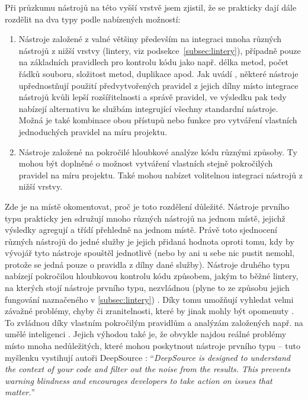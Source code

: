 Při průzkumu nástrojů na této vyšší vrstvě jsem zjistil, že se prakticky dají dále rozdělit na dva typy podle nabízených možností:
\begin{enumerate}
    \item Nástroje založené z valné většiny především na integraci mnoha různých nástrojů z nižší vrstvy (lintery, viz podsekce~\ref{subsec:lintery}), případně pouze na základních pravidlech pro kontrolu kódu jako např. délka metod, počet řádků souboru, složitost metod, duplikace apod. Jak uvádí \cite{globema-onpremise}, některé nástroje upřednostňují použití předvytvořených pravidel z jejich dílny místo integrace nástrojů kvůli lepší rozšířitelnosti a správě pravidel, ve výsledku pak tedy nabízejí alternativu ke službám integrující všechny standardní nástroje. Možná je také kombinace obou přístupů nebo funkce pro vytváření vlastních jednoduchých pravidel na míru projektu.
    \item Nástroje založené na pokročilé hloubkové analýze kódu různými způsoby. Ty mohou být doplněné o možnost vytváření vlastních stejně pokročilých pravidel na míru projektu. Také mohou nabízet volitelnou integraci nástrojů z nižší vrstvy.
\end{enumerate}

Zde je na místě okomentovat, proč je toto rozdělení důležité. Nástroje prvního typu prakticky jen sdružují mnoho různých nástrojů na jednom místě, jejichž výsledky agregují a třídí přehledně na jednom místě. Právě toto sjednocení různých nástrojů do jedné služby je jejich přidaná hodnota oproti tomu, kdy by vývojář tyto nástroje spouštěl jednotlivě (nebo by ani u sebe nic pustit nemohl, protože se jedná pouze o pravidla z dílny dané služby). Nástroje druhého typu nabízejí pokročilou hloubkovou kontrolu kódu způsobem, jakým to běžné lintery, na kterých stojí nástroje prvního typu, nezvládnou (plyne to ze způsobu jejich fungování naznačeného v \ref{subsec:lintery}) \cite{deepscan-lintercompare}. Díky tomu umožňují vyhledat velmi závažné problémy, chyby či zranitelnosti, které by jinak mohly být opomenuty \cite{deepscan-lintercompare, deepsource2}. To zvládnou díky vlastním pokročilým pravidlům a analýzám založených např. na umělé inteligenci \cite{deepsource2}. Jejich výhodou také je, že obvykle najdou reálné problémy místo mnoha nedůležitých, které mohou poskytnout nástroje prvního typu -- tuto myšlenku vystihují autoři DeepSource \cite{deepsource2}: \enquote{\textit{DeepSource is designed to understand the context of your code and filter out the noise from the results. This prevents warning blindness and encourages developers to take action on issues that matter.}}


